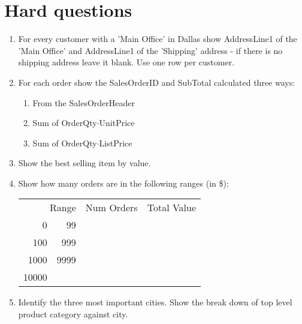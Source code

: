 \documentclass[a4paper]{article}
\begin{document}
	\section{Hard questions}
	\begin{enumerate}
		\addtocounter{enumi}{10}
		\item For every customer with a 'Main Office' in Dallas show
		AddressLine1 of the 'Main Office' and AddressLine1 of the 'Shipping'
		address - if there is no shipping address leave it blank. Use one row
		per customer.
			
		\item For each order show the SalesOrderID and SubTotal calculated
		three ways: \begin{enumerate}
			\item From the SalesOrderHeader 
			\item Sum of OrderQty$\cdot$UnitPrice
			\item Sum of OrderQty$\cdot$ListPrice 
			\end{enumerate}
			
		\item Show the best selling item by value.
			
		\item Show how many orders are in the following ranges (in \$):

			\begin{tabular}{r@{ - }rrr}
				\multicolumn{2}{r}{Range} & Num Orders & Total Value \\
				0& 99 \\
				100& 999\\
				1000& 9999\\
				10000&
			\end{tabular}
			
		\item Identify the three most important cities. Show the break down of
		top level product category against city.
			
	\end{enumerate}
\end{document}
